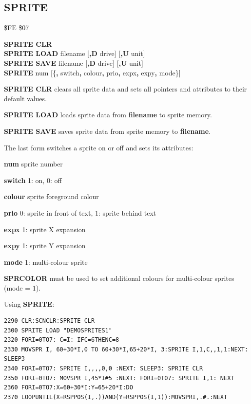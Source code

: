 \subsection{SPRITE}
\begin{description}[leftmargin=2cm,style=nextline]
\item [Token:] \$FE \$07
\item [Format:] {\bf SPRITE CLR} \\
                {\bf SPRITE LOAD} filename [{\bf,D} drive] [{\bf,U} unit] \\
                {\bf SPRITE SAVE} filename [{\bf,D} drive] [{\bf,U} unit] \\
                {\bf SPRITE} num [\{{\bf,} switch{\bf,} colour{\bf,}
		prio{\bf,} expx{\bf,} expy{\bf,} mode\}]
\item [Usage:]  {\bf SPRITE CLR} clears all sprite data and sets all pointers
                and attributes to their default values.

                {\bf SPRITE LOAD } loads sprite data from {\bf filename}
                to sprite memory.

                {\bf SPRITE SAVE } saves sprite data from
                sprite memory to {\bf filename}.

                \filenamedefinition

                The last form switches a sprite on or off and sets its attributes:

                {\bf num} sprite number

                {\bf switch} 1: on, 0: off

                {\bf colour} sprite foreground colour

                {\bf prio} 0: sprite in front of text, 1: sprite behind text

                {\bf expx} 1: sprite X expansion

                {\bf expy} 1: sprite Y expansion

                {\bf mode} 1: multi-colour sprite

\item [Remarks:] {\bf SPRCOLOR} must be used to set
                additional colours
                for multi-colour sprites (mode = 1).

\item [Example:] Using {\bf SPRITE}:
\begin{tcolorbox}[colback=black,coltext=white]
\verbatimfont{\codefont}
\begin{verbatim}
2290 CLR:SCNCLR:SPRITE CLR
2300 SPRITE LOAD "DEMOSPRITES1"
2320 FORI=0TO7: C=I: IFC=6THENC=8
2330 MOVSPR I, 60+30*I,0 TO 60+30*I,65+20*I, 3:SPRITE I,1,C,,1,1:NEXT: SLEEP3
2340 FORI=0TO7: SPRITE I,,,,0,0 :NEXT: SLEEP3: SPRITE CLR
2350 FORI=0TO7: MOVSPR I,45*I#5 :NEXT: FORI=0TO7: SPRITE I,1: NEXT
2360 FORI=0TO7:X=60+30*I:Y=65+20*I:DO
2370 LOOPUNTIL(X=RSPPOS(I,.))AND(Y=RSPPOS(I,1)):MOVSPRI,.#.:NEXT
\end{verbatim}
\end{tcolorbox}
\end{description}

